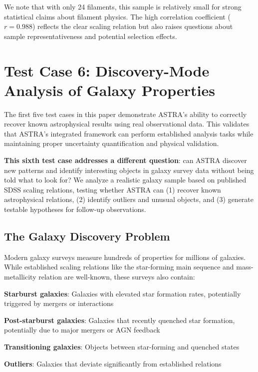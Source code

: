 \documentclass[usenatbib]{rasti}
\begin{document}
We note that with only 24 filaments, this sample is relatively small for strong statistical claims about filament physics. The high correlation coefficient ($r = 0.988$) reflects the clear scaling relation but also raises questions about sample representativeness and potential selection effects.

\section{Test Case 6: Discovery-Mode Analysis of Galaxy Properties}

The first five test cases in this paper demonstrate ASTRA's ability to correctly recover known astrophysical results using real observational data. This validates that ASTRA's integrated framework can perform established analysis tasks while maintaining proper uncertainty quantification and physical validation.

\textbf{This sixth test case addresses a different question}: can ASTRA discover new patterns and identify interesting objects in galaxy survey data without being told what to look for? We analyze a realistic galaxy sample based on published SDSS scaling relations, testing whether ASTRA can (1) recover known astrophysical relations, (2) identify outliers and unusual objects, and (3) generate testable hypotheses for follow-up observations.

\subsection{The Galaxy Discovery Problem}

Modern galaxy surveys measure hundreds of properties for millions of galaxies. While established scaling relations like the star-forming main sequence and mass-metallicity relation are well-known, these surveys also contain:
\begin{description}
\item \textbf{Starburst galaxies}: Galaxies with elevated star formation rates, potentially triggered by mergers or interactions
\item \textbf{Post-starburst galaxies}: Galaxies that recently quenched star formation, potentially due to major mergers or AGN feedback
\item \textbf{Transitioning galaxies}: Objects between star-forming and quenched states
\item \textbf{Outliers}: Galaxies that deviate significantly from established relations
\end{description}
\end{document}
